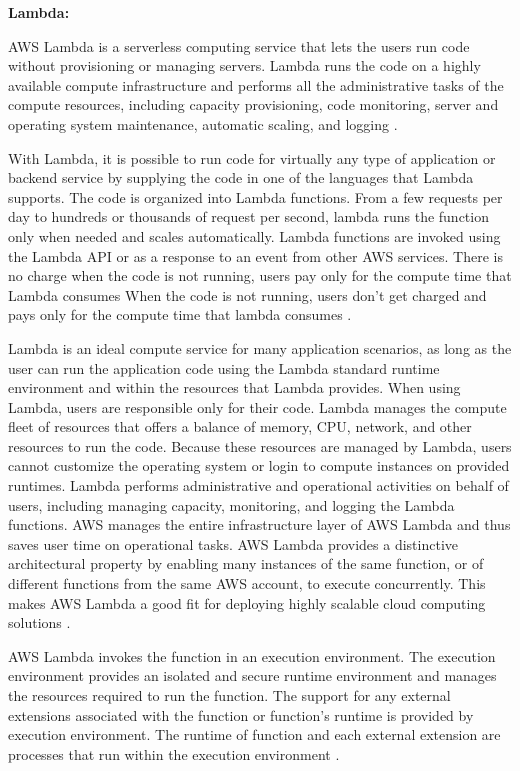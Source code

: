 \textbf{Lambda:}
\par AWS Lambda is a serverless computing service that lets the users run code without provisioning or managing servers.
Lambda runs the code on a highly available compute
infrastructure and performs all the administrative tasks
of the compute resources, including capacity provisioning, code monitoring, server and operating system maintenance, automatic scaling, and logging \cite{45}.

\par With Lambda, it is possible to run code for virtually any type of application or backend service by supplying the code in one of the languages that Lambda supports.
The code is organized into Lambda functions.
From a few requests per day to hundreds or thousands of
request per second, lambda runs the function only when
needed and scales automatically.
Lambda functions are invoked using the Lambda API or as a response to an event from other AWS services.
There is no charge when the code is not running, users pay only for the compute time that Lambda consumes
When the code is not running, users don't get charged
and pays only for the compute time
that lambda consumes \cite{46}.

\par Lambda is an ideal compute service for many application scenarios, as long as the user can run the application code using the Lambda standard runtime environment and within the resources that Lambda provides.
When using Lambda, users are responsible only for their code.
Lambda manages the compute fleet of resources that offers a balance of memory, CPU, network, and other resources to run the code.
Because these resources are managed by Lambda, users cannot customize the operating system or login to compute instances on provided runtimes.
Lambda performs administrative and operational activities on behalf of users, including managing capacity, monitoring, and logging the Lambda functions.
AWS manages the entire infrastructure layer of AWS Lambda
and thus saves user time on operational tasks. AWS Lambda
provides a distinctive architectural property by enabling many instances of the same function, or of different functions from the same AWS account, to execute concurrently. This makes AWS Lambda a good fit for deploying highly scalable cloud computing solutions \cite{46}.

\par AWS Lambda invokes the function in an execution environment.
The execution environment provides an isolated and secure runtime environment and manages the resources required to run the function.
The support for any external extensions associated with the function or function's runtime is provided by execution environment.
The runtime of function and each external extension are
processes that run within the execution environment
\cite{46}.

